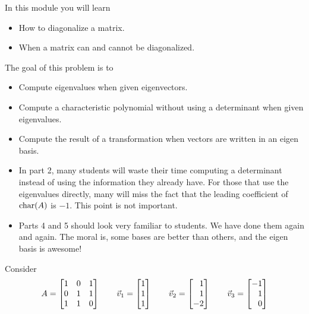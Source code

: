 \begin{module}

	In this module you will learn
	\begin{itemize}
		\item How to diagonalize a matrix.
		\item When a matrix can and cannot be diagonalized.
	\end{itemize}

	
	
\end{module}
	\bookonlynewpage
	\question
	\label{actingOnEigenvectors}
	\begin{annotation}
		\begin{goals}

			The goal of this problem is to
			\begin{itemize}
				\item Compute eigenvalues when given eigenvectors.
				\item Compute a characteristic polynomial without using a determinant
					when given eigenvalues.
				\item Compute the result of a transformation when vectors are written in an eigen basis.
			\end{itemize}
		\end{goals}

		\begin{notes}
			\begin{itemize}
				\item In part 2, many students will waste their time computing a determinant instead
					of using the information they already have. For those that use the eigenvalues
					directly, many will miss the fact that the leading coefficient of $\operatorname{char}(A)$ is $-1$.
					This point is not important.
				\item Parts 4 and 5 should look very familiar to students. We have done them again and again.
					The moral is, some bases are better than others, and the eigen basis is awesome!
			\end{itemize}
		\end{notes}
	\end{annotation}
	Consider
	\[
		A=\mat{1&0&1\\0&1&1\\1&1&0}\qquad
		\vec v_1=\mat{1\\1\\1}\qquad
		\vec v_2=\mat{1\\1\\-2}\qquad
		\vec v_3=\mat{-1\\1\\0}
	\]
